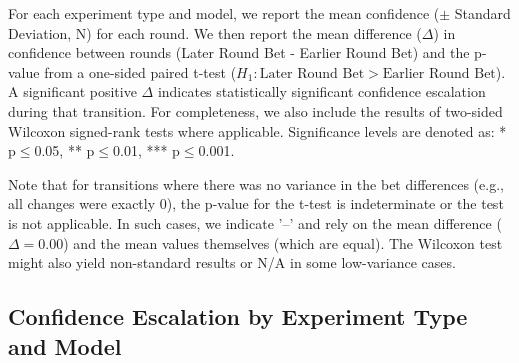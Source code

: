 \documentclass{article}
\begin{document}
For each experiment type and model, we report the mean confidence ($\pm$ Standard Deviation, N) for each round. We then report the mean difference ($\Delta$) in confidence between rounds (Later Round Bet - Earlier Round Bet) and the p-value from a one-sided paired t-test ($H_1: \text{Later Round Bet} > \text{Earlier Round Bet}$). A significant positive $\Delta$ indicates statistically significant confidence escalation during that transition. For completeness, we also include the results of two-sided Wilcoxon signed-rank tests where applicable. Significance levels are denoted as: * p$\le$0.05, ** p$\le$0.01, *** p$\le$0.001.

Note that for transitions where there was no variance in the bet differences (e.g., all changes were exactly 0), the p-value for the t-test is indeterminate or the test is not applicable. In such cases, we indicate '--' and rely on the mean difference ($\Delta=0.00$) and the mean values themselves (which are equal). The Wilcoxon test might also yield non-standard results or N/A in some low-variance cases.

\subsection{Confidence Escalation by Experiment Type and Model}
\end{document}
